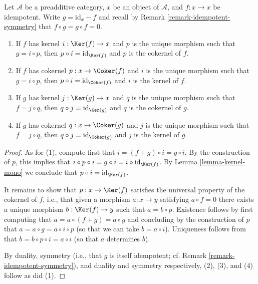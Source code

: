 \begin{lemma}
\label{lemma-idempotent-kernel-cokernel}
Let $\mathcal{A}$ be a preadditive category,
$x$ be an object of $\mathcal{A}$,
and $f : x \to x$ be idempotent.
Write $g = \text{id} _ x - f$
and recall by Remark \ref{remark-idempotent-symmetry}
that $f \circ g = g \circ f = 0$.
\begin{enumerate}
\item If $f$ has kernel $i : \Ker (f) \to x$
and $p$ is the unique morphism such that $g = i \circ p$,
then $p \circ i = \text{id} _ {\Ker (f)}$
and $p$ is the cokernel of $f$.
\item If $f$ has cokernel $p : x \to \Coker (f)$
and $i$ is the unique morphism such that $g = i \circ p$,
then $p \circ i = \text{id} _ {\Coker (f)}$
and $i$ is the kernel of $f$.
\item If $g$ has kernel $j : \Ker (g) \to x$
and $q$ is the unique morphism such that $f = j \circ q$,
then $q \circ j = \text{id} _ {\Ker (g)}$
and $q$ is the cokernel of $g$.
\item If $g$ has cokernel $q : x \to \Coker (g)$
and $j$ is the unique morphism such that $f = j \circ q$,
then $q \circ j = \text{id} _ {\Coker (g)}$
and $j$ is the kernel of $g$.
\end{enumerate}
\end{lemma}

\begin{proof}
As for (1), compute first that $i = (f + g) \circ i = g \circ i$.
By the construction of $p$, this implies that
$i \circ p \circ i = g \circ i = i \circ \text{id} _ {\Ker (f)}$.
By Lemma \ref{lemma-kernel-mono} we conclude that
$p \circ i = \text{id} _ {\Ker (f)}$.

\medskip\noindent
It remains to show that $p : x \to \Ker (f)$
satisfies the universal property of the cokernel of $f$,
i.e., that given a morphism $a : x \to y$ satisfying $a \circ f = 0$
there exists a unique morphism $b : \Ker (f) \to y$
such that $a = b \circ p$.
Existence follows by first computing that $a = a \circ (f + g) = a \circ g$
and concluding by the construction of $p$
that $a = a \circ g = a \circ i \circ p$
(so that we can take $b = a \circ i$).
Uniqueness follows from that $b = b \circ p \circ i = a \circ i$
(so that $a$ determines $b$).

\medskip\noindent
By duality,
symmetry (i.e., that $g$ is itself idempotent;
cf. Remark \ref{remark-idempotent-symmetry}),
and duality and symmetry respectively, (2), (3), and (4) follow as did (1).
\end{proof}

